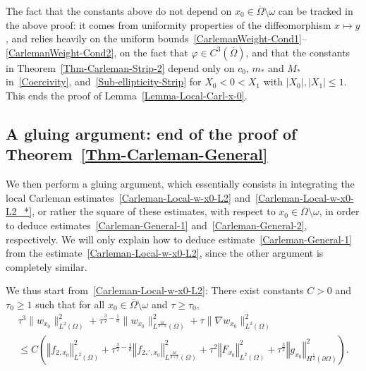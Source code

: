 \documentclass[AHL,Unicode,longabstracts]{cedram}
\newcommand{\norm}[1]{\left\Vert#1\right\Vert}
\renewcommand{\leq}{\leqslant}
\renewcommand{\geq}{\geqslant}
\begin{document}
The fact that the constants above do not depend on $x_0 \in \overline\Omega \setminus \omega$ can be tracked in the above proof: it comes from uniformity properties of the diffeomorphism $x \mapsto y$, and relies heavily on the uniform bounds~\eqref{CarlemanWeight-Cond1}--\eqref{CarlemanWeight-Cond2}, on the fact that $\varphi \in C^3(\overline\Omega)$, and that the constants in Theorem~\ref{Thm-Carleman-Strip-2} depend only on $c_0$, $m_*$ and $M_*$ in~\eqref{Coercivity}, and~\eqref{Sub-ellipticity-Strip} for $X_0 < 0 < X_1$ with $|X_0|, |X_1| \leq 1$. This ends the proof of Lemma~\ref{Lemma-Local-Carl-x-0}.



\subsection{A gluing argument: end of the proof of Theorem~\ref{Thm-Carleman-General}}\label{Sec-Gluing}

We then perform a gluing argument, which essentially consists in integrating the local Carleman estimates~\eqref{Carleman-Local-w-x0-L2} and~\eqref{Carleman-Local-w-x0-L2_*}, or rather the square of these estimates, with respect to $x_0 \in \overline\Omega \setminus \omega$, in order to deduce estimates~\eqref{Carleman-General-1} and~\eqref{Carleman-General-2}, respectively. We will only explain how to deduce estimate~\eqref{Carleman-General-1} from the estimate~\eqref{Carleman-Local-w-x0-L2}, since the other argument is completely similar.

We thus start from~\eqref{Carleman-Local-w-x0-L2}: There exist constants $C>0$ and $\tau_0 \geq 1$ such that for all $x_0 \in \overline\Omega \setminus \omega$ and $\tau \geq \tau_0$,
\begin{multline*}
\tau^{3} \| w_{x_0} \|_{L^2(\Omega)}^2 +
\tau^{\frac{3}{2}-\frac{1}{d}} \| w_{x_0} \|_{L^{\frac{2d}{d-2}}(\Omega)}^2 +
\tau \| \nabla w_{x_0} \|_{L^2(\Omega)}^2
\\
\leq C\left(
\norm{f_{2,x_0}}_{L^2(\Omega)} ^2 +
\tau^{\frac{3}{2}-\frac{1}{d}} \norm{f_{2_*',x_0} }_{L^{\frac{2d}{d+2}}(\Omega)}^2 +
\tau^2 \norm{F_{x_0}}_{L^2(\Omega)}^2 +
\tau^{\frac{3}{2}} \norm{g_{x_0}}_{H^{\frac{1}{2}}(\partial\Omega)}^2
\right).
\end{multline*}
\end{document}
